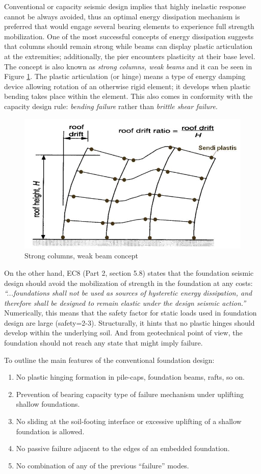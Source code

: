 \documentclass[11pt,a4paper]{report}
\begin{document}
Conventional or capacity seismic design implies that highly inelastic response cannot be always avoided, thus an optimal energy dissipation mechanism is preferred that would engage several bearing elements to experience full strength mobilization. One of the most successful concepts of energy dissipation suggests that columns should remain strong while beams can display plastic articulation at the extremities; additionally, the pier encounters plasticity at their base level. The concept is also known as \textit{strong columns, weak beams} and it can be seen in Figure \ref{strongCol}. The plastic articulation (or hinge) means a type of energy damping device allowing rotation of an otherwise rigid element; it develops when plastic bending takes place within the element. This also comes in conformity with the capacity design rule:  \textit{bending failure} rather than \textit{brittle shear failure}.

\begin{figure}[h!]
	\centering
	\includegraphics[width=0.5\linewidth]{"plastification"}
	\caption{Strong columns, weak beam concept}
	\label{strongCol}
\end{figure}

On the other hand, EC8 (Part 2, section 5.8) \cite{code2005eurocode} states that the foundation seismic design should avoid the mobilization of strength in the foundation at any costs: \textit{“...foundations shall not be used as sources of hysteretic energy dissipation, and therefore shall be designed to remain elastic under the design seismic action.”} Numerically, this means that the safety factor for static loads used in foundation design are large (\gls{safety}=2-3). Structurally, it hints that no plastic hinges should develop within the underlying soil. And from geotechnical point of view, the foundation should not reach any state that might imply failure. 

To outline the main features of the conventional foundation design:
\begin{enumerate}
	\item  No plastic hinging formation in pile-caps, foundation beams, rafts, so on.
	\item Prevention of bearing capacity type of failure mechanism under uplifting shallow foundations.
	\item No sliding at the soil-footing interface or excessive uplifting of a shallow foundation is allowed.
	\item No passive failure adjacent to the edges of an embedded foundation.
	\item No combination of any of the previous “failure” modes.
\end{enumerate}
\end{document}
